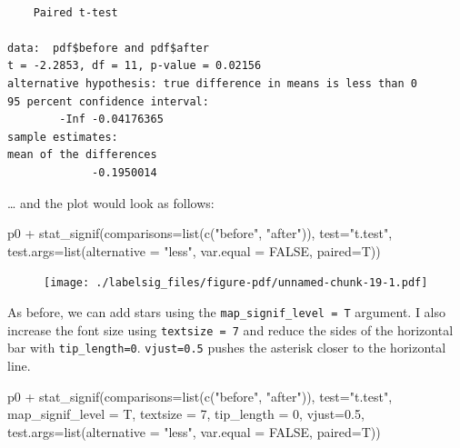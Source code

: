 \documentclass[
  letterpaper,
  DIV=11,
  numbers=noendperiod]{scrreprt}
\newenvironment{Shaded}{\begin{snugshade}}{\end{snugshade}}
\newcommand{\AttributeTok}[1]{\textcolor[rgb]{0.40,0.45,0.13}{#1}}
\newcommand{\ConstantTok}[1]{\textcolor[rgb]{0.56,0.35,0.01}{#1}}
\newcommand{\DecValTok}[1]{\textcolor[rgb]{0.68,0.00,0.00}{#1}}
\newcommand{\FloatTok}[1]{\textcolor[rgb]{0.68,0.00,0.00}{#1}}
\newcommand{\FunctionTok}[1]{\textcolor[rgb]{0.28,0.35,0.67}{#1}}
\newcommand{\NormalTok}[1]{\textcolor[rgb]{0.00,0.23,0.31}{#1}}
\newcommand{\SpecialCharTok}[1]{\textcolor[rgb]{0.37,0.37,0.37}{#1}}
\newcommand{\StringTok}[1]{\textcolor[rgb]{0.13,0.47,0.30}{#1}}
\begin{document}
\begin{verbatim}

    Paired t-test

data:  pdf$before and pdf$after
t = -2.2853, df = 11, p-value = 0.02156
alternative hypothesis: true difference in means is less than 0
95 percent confidence interval:
        -Inf -0.04176365
sample estimates:
mean of the differences 
             -0.1950014 
\end{verbatim}

\ldots{} and the plot would look as follows:

\begin{Shaded}
\begin{Highlighting}[]
\NormalTok{p0  }\SpecialCharTok{+}
    \FunctionTok{stat\_signif}\NormalTok{(}\AttributeTok{comparisons=}\FunctionTok{list}\NormalTok{(}\FunctionTok{c}\NormalTok{(}\StringTok{"before"}\NormalTok{, }\StringTok{"after"}\NormalTok{)),}
                \AttributeTok{test=}\StringTok{"t.test"}\NormalTok{, }
                \AttributeTok{test.args=}\FunctionTok{list}\NormalTok{(}\AttributeTok{alternative =} \StringTok{"less"}\NormalTok{, }
                               \AttributeTok{var.equal =} \ConstantTok{FALSE}\NormalTok{, }
                               \AttributeTok{paired=}\NormalTok{T))}
\end{Highlighting}
\end{Shaded}

\begin{figure}[H]

{\centering \texttt{[image: ./labelsig\_files/figure-pdf/unnamed-chunk-19-1.pdf]}

}

\end{figure}

As before, we can add stars using the \texttt{map\_signif\_level\ =\ T}
argument. I also increase the font size using \texttt{textsize\ =\ 7}
and reduce the sides of the horizontal bar with \texttt{tip\_length=0}.
\texttt{vjust=0.5} pushes the asterisk closer to the horizontal line.

\begin{Shaded}
\begin{Highlighting}[]
\NormalTok{ p0  }\SpecialCharTok{+}
    \FunctionTok{stat\_signif}\NormalTok{(}\AttributeTok{comparisons=}\FunctionTok{list}\NormalTok{(}\FunctionTok{c}\NormalTok{(}\StringTok{"before"}\NormalTok{, }\StringTok{"after"}\NormalTok{)),}
                \AttributeTok{test=}\StringTok{"t.test"}\NormalTok{, }
                \AttributeTok{map\_signif\_level =}\NormalTok{ T,}
                \AttributeTok{textsize =} \DecValTok{7}\NormalTok{,}
                \AttributeTok{tip\_length =} \DecValTok{0}\NormalTok{,}
                \AttributeTok{vjust=}\FloatTok{0.5}\NormalTok{,}
                \AttributeTok{test.args=}\FunctionTok{list}\NormalTok{(}\AttributeTok{alternative =} \StringTok{"less"}\NormalTok{, }
                               \AttributeTok{var.equal =} \ConstantTok{FALSE}\NormalTok{, }
                               \AttributeTok{paired=}\NormalTok{T))}
\end{Highlighting}
\end{Shaded}
\end{document}
